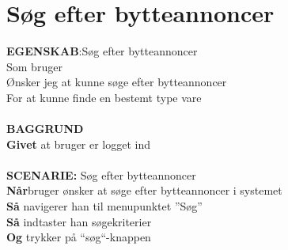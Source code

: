 \section{Søg efter bytteannoncer}
{\color{blue}\textbf{EGENSKAB}:}Søg efter bytteannoncer \\
Som bruger \\
Ønsker jeg at kunne søge efter bytteannoncer \\
For at kunne finde en bestemt type vare\\ \\
{\color{blue}\textbf{BAGGRUND}} \\
{\color{blue}\textbf{Givet}} at bruger er logget ind \\
\\
{\color{blue}\textbf{SCENARIE:}} Søg efter bytteannoncer \\
{\color{blue}\textbf{Når}}bruger ønsker at søge efter bytteannoncer i systemet\\
{\color{blue}\textbf{Så}} navigerer han til menupunktet ”Søg” \\
{\color{blue}\textbf{Så}} indtaster han søgekriterier\\
{\color{blue}\textbf{Og}} trykker på “søg“-knappen